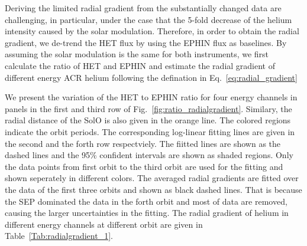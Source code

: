 Deriving the limited radial gradient from the substantially changed data are challenging, in particular, under the case that the 5-fold decrease of the helium intensity caused by the solar modulation.
Therefore, in order to obtain the radial gradient, we de-trend the \ac{HET} flux by using the \ac{EPHIN} flux as baselines. By assuming the solar modulation is the same for both instruments, we first calculate the ratio of \ac{HET} and \ac{EPHIN} and estimate the radial gradient of different energy \ac{ACR} helium following the defination in Eq.~\ref{eq:radial_gradient}

We present the variation of the \ac{HET} to \ac{EPHIN} ratio for four energy channels in panels in the first and third row of Fig.~\ref{fig:ratio_radialgradient}. Similary, the radial distance of the \ac{SolO} is also given in the orange line. The colored regions indicate the orbit periods. The corresponding log-linear fitting lines are given in the second and the forth row respectviely. The fiitted lines are shown as the dashed lines and the 95\% confident intervals are shown as shaded regions. Only the data points from first orbit to the third orbit are used for the fitting and shown seperately in different colors. The averaged radial gradients are fitted over the data of the first three orbits and shown as black dashed lines.
That is because the \ac{SEP} dominated the data in the forth orbit and most of data are removed, causing the larger uncertainties in the fitting. The radial gradient of helium in different energy channels at different orbit are given in Table~\ref{Tab:radialgradient_1}.




